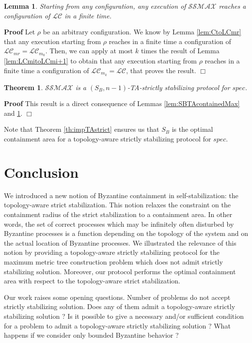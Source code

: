\documentclass[11pt]{article}
\newenvironment{proof}{\noindent\textbf{Proof}}{\hfill\qed}
\newcommand{\qed}{\hfill$\Box$}
\newtheorem{lem}{Lemma}
\newtheorem{theo}{Theorem}
\newenvironment{theorem}[1]{\vspace{-0.25cm}\begin{theo}#1}{\end{theo}\vspace{-0.3cm}}
\newenvironment{lemma}[1]{\vspace{-0.25cm}\begin{lem}#1}{\end{lem}\vspace{-0.3cm}}
\begin{document}
\begin{lemma}\label{lem:convergenceLCMax}
Starting from any configuration, any execution of $\mathcal{SSMAX}$ reaches a configuration of $\mathcal{LC}$ in a finite time.
\end{lemma}

\begin{proof}
Let $\rho$ be an arbitrary configuration. We know by Lemma \ref{lem:CtoLCmr} that any execution starting from $\rho$ reaches in a finite time a configuration of $\mathcal{LC}_{mr}=\mathcal{LC}_{m_0}$. Then, we can apply at most $k$ times the result of Lemma \ref{lem:LCmitoLCmi+1} to obtain that any execution starting from $\rho$ reaches in a finite time a configuration of $\mathcal{LC}_{m_k}=\mathcal{LC}$, that proves the result.
\end{proof}

\begin{theorem}\label{th:SSMAXstrict}
$\mathcal{SSMAX}$ is a $(S_B,n-1)$-TA-strictly stabilizing protocol for $spec$.
\end{theorem}

\begin{proof}
This result is a direct consequence of Lemmas \ref{lem:SBTAcontainedMax} and \ref{lem:convergenceLCMax}.
\end{proof}

Note that Theorem \ref{th:impTAstrict} ensures us that $S_B$ is the optimal containment area for a topology-aware strictly stabilizing protocol for $spec$.

\section{Conclusion}

We introduced a new notion of Byzantine containment in self-stabilization: the topology-aware strict stabilization. This notion relaxes the constraint on the containment radius of the strict stabilization to a containment area. In other words, the set of correct processes which may be infinitely often disturbed by Byzantine processes is a function depending on the topology of the system and on the actual location of Byzantine processes. We illustrated the relevance of this notion by providing a topology-aware strictly stabilizing protocol for the maximum metric tree construction problem which does not admit strictly stabilizing solution. Moreover, our protocol performs the optimal containment area with respect to the topology-aware strict stabilization.

Our work raises some opening questions. Number of problems do not accept strictly stabilizing solution. Does any of them admit a topology-aware strictly stabilizing solution ? Is it possible to give a necessary and/or sufficient condition for a problem to admit a topology-aware strictly stabilizing solution ? What happens if we consider only bounded Byzantine behavior ?



\end{document}
